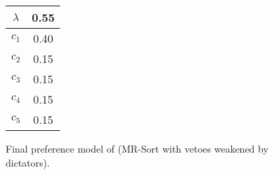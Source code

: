 \begin{figure}
\begin{minipage}[c]{0.07\columnwidth}
\begin{tabular}{c|c}
$\lambda$ & 0.55 \\\hline
$c_1$ & 0.40 \\
$c_2$ & 0.15 \\
$c_3$ & 0.15 \\
$c_4$ & 0.15 \\
$c_5$ & 0.15
\end{tabular}
\end{minipage}

\caption{Final preference model of \DB (MR-Sort with vetoes weakened by dictators).}\label{fig:ex2-model4}
\end{figure}